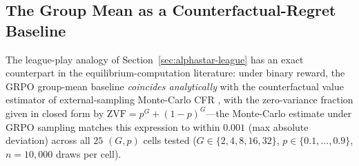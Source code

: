 %
%

\subsection{The Group Mean as a Counterfactual-Regret Baseline}
\label{sec:cfr-baseline}

The league-play analogy of Section~\ref{sec:alphastar-league} has an
exact counterpart in the equilibrium-computation literature: under
binary reward, the GRPO group-mean baseline \emph{coincides
analytically} with the counterfactual value estimator of
external-sampling Monte-Carlo CFR \citep{brown2020rebel}, with the
zero-variance fraction given in closed form by
$\mathrm{ZVF} = p^G + (1-p)^G$---the Monte-Carlo estimate under GRPO
sampling matches this expression to within $0.001$ (max absolute
deviation) across all $25$ $(G, p)$ cells tested
($G \in \{2,4,8,16,32\}$, $p \in \{0.1,\dots,0.9\}$, $n{=}10{,}000$
draws per cell).

